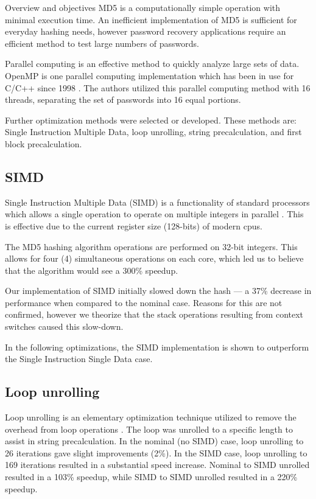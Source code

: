 	Overview and objectives
	MD5 is a computationally simple operation with minimal execution time. An inefficient implementation of MD5 is sufficient for everyday hashing needs, however password recovery applications require an efficient method to test large numbers of passwords. 

	Parallel computing is an effective method to quickly analyze large sets of data. OpenMP is one parallel computing implementation which has been in use for C/C++ since 1998 \cite{openmp}. The authors utilized this parallel computing method with 16 threads, separating the set of passwords into 16 equal portions. 

	Further optimization methods were selected or developed. These methods are: Single Instruction Multiple Data, loop unrolling, string precalculation, and first block precalculation. 

	\subsection{SIMD}
		Single Instruction Multiple Data (SIMD) is a functionality of standard processors which allows a single operation to operate on multiple integers in parallel \cite{simd}. This is effective due to the current register size (128-bits) of modern cpus. 

		The MD5 hashing algorithm operations are performed on 32-bit integers. This allows for four (4) simultaneous operations on each core, which led us to believe that the algorithm would see a 300\% speedup. 

		Our implementation of SIMD initially slowed down the hash --- a 37\% decrease in performance when compared to the nominal case. Reasons for this are not confirmed, however we theorize that the stack operations resulting from context switches caused this slow-down. 

		In the following optimizations, the SIMD implementation is shown to outperform the Single Instruction Single Data case. 

	\subsection{Loop unrolling}
		Loop unrolling is an elementary optimization technique utilized to remove the overhead from loop operations \cite{Dongarra1979}. The loop was unrolled to a specific length to assist in string precalculation. In the nominal (no SIMD) case, loop unrolling to 26 iterations gave slight improvements (2\%). In the SIMD case, loop unrolling to 169 iterations resulted in a substantial speed increase. Nominal to SIMD unrolled resulted in a 103\% speedup, while SIMD to SIMD unrolled resulted in a 220\% speedup.  
